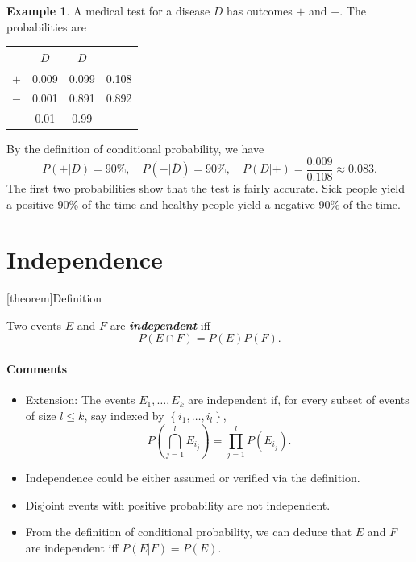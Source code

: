\documentclass[12pt]{report}
\theoremstyle{definition}
\begin{document}
\newtheorem{conditional probability eg}[theorem]{Example}
\begin{conditional probability eg}
    A medical test for a disease $D$ has outcomes $+$ and $-$.
    The probabilities are
    \begin{table}[h]
        \centering
        \begin{tabular}{l||c|c|c}
            & $D$ & $\overline{D}$ & \\
            \hline\hline
            $+$ & 0.009 & 0.099 & 0.108 \\
            \hline
            $-$ & 0.001 & 0.891 & 0.892 \\
            \hline
                & 0.01 & 0.99 &
        \end{tabular} 
    \end{table} 

    By the definition of conditional probability, we have
    \[
        P(+|D)=90\%,\quad P(-|\overline{D})=90\%, \quad
        P(D|+)=\frac{0.009}{0.108}\approx 0.083.
    \]
    The first two probabilities show that the test is fairly accurate. Sick
    people yield a positive 90\% of the time and healthy people yield a negative
    90\% of the time.
\end{conditional probability eg}


\section{Independence}

[theorem]{Definition}
\begin{independence}
    Two events $E$ and $F$ are \textbf{\emph{independent}} iff
    \[
        P(E\cap F)=P(E)P(F).
    \]
\end{independence}
\paragraph{Comments}
\begin{itemize}
    \item Extension: The events $E_1,\ldots,E_k$ are independent if, for every
        subset of events of size $l\le k$, say indexed by
        $\left\{i_1,\ldots,i_l\right\}$,
        \[
            P\left(\bigcap_{j=1}^l E_{i_j}\right)=\prod_{j=1}^{l} P(E_{i_j}).
        \]
    \item Independence could be either assumed or verified via the definition.
    \item Disjoint events with positive probability are not independent.
    \item From the definition of conditional probability, we can deduce that
        $E$ and $F$ are independent iff $P(E|F)=P(E)$.
\end{itemize} 
\end{document}
